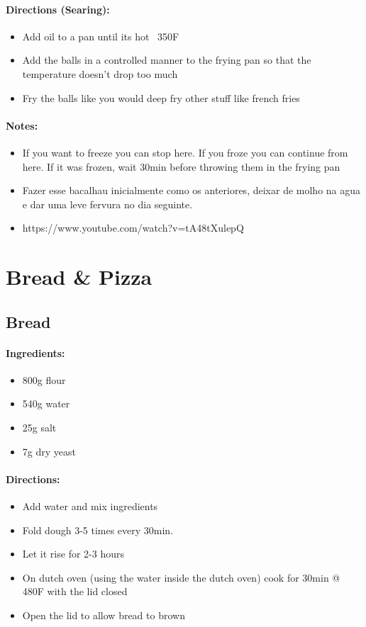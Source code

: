\documentclass{article}
\begin{document}
\paragraph{Directions (Searing):}
\begin{itemize}
    \item Add oil to a pan until its hot ~350F
    \item Add the balls in a controlled manner to the frying pan so that the temperature doesn't drop too much
    \item Fry the balls like you would deep fry other stuff like french fries
\end{itemize} 

\paragraph{Notes:}
\begin{itemize}
    \item If you want to freeze you can stop here. If you froze you can continue from here. If it was frozen, wait 30min before throwing them in the frying pan
    \item Fazer esse bacalhau inicialmente como os anteriores, deixar de molho na agua e dar uma leve fervura no dia seguinte.
    \item https://www.youtube.com/watch?v=tA48tXulepQ
\end{itemize}

\section{Bread \& Pizza}


\subsection{Bread}

\paragraph{Ingredients:}
\begin{itemize}
    \item 800g flour
    \item 540g water
    \item 25g salt
    \item 7g dry yeast
\end{itemize}

\paragraph{Directions:}
\begin{itemize}
    \item Add water and mix ingredients
    \item Fold dough 3-5 times every 30min.
    \item Let it rise for 2-3 hours
    \item On dutch oven (using the water inside the dutch oven) cook for 30min @ 480F with the lid closed
    \item Open the lid to allow bread to brown
\end{itemize}
\end{document}
